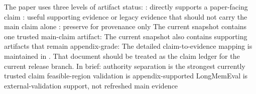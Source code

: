 {}
\markdownRendererSectionEnd \markdownRendererSectionBegin
{}\markdownRendererInterblockSeparator
{}The paper uses three levels of artifact status:\markdownRendererInterblockSeparator
{}\markdownRendererUlBeginTight
\markdownRendererUlItem {}: directly supports a paper-facing claim\markdownRendererUlItemEnd 
\markdownRendererUlItem {}: useful supporting evidence or legacy evidence that should not carry the main claim alone\markdownRendererUlItemEnd 
\markdownRendererUlItem {}: preserve for provenance only\markdownRendererUlItemEnd 
\markdownRendererUlEndTight \markdownRendererInterblockSeparator
{}The current snapshot contains one trusted main-claim artifact:\markdownRendererInterblockSeparator
{}\markdownRendererUlBeginTight
\markdownRendererUlItem {}\markdownRendererUlItemEnd 
\markdownRendererUlEndTight \markdownRendererInterblockSeparator
{}The current snapshot also contains supporting artifacts that remain appendix-grade:\markdownRendererInterblockSeparator
{}\markdownRendererUlBeginTight
\markdownRendererUlItem {}\markdownRendererUlItemEnd 
\markdownRendererUlItem {}\markdownRendererUlItemEnd 
\markdownRendererUlEndTight \markdownRendererInterblockSeparator
{}
\markdownRendererSectionEnd \markdownRendererSectionBegin
{}\markdownRendererInterblockSeparator
{}The detailed claim-to-evidence mapping is maintained in .\markdownRendererSoftLineBreak
{}That document should be treated as the claim ledger for the current release branch.\markdownRendererParagraphSeparator
{}In brief:\markdownRendererInterblockSeparator
{}\markdownRendererUlBeginTight
\markdownRendererUlItem authority separation is the strongest currently trusted claim\markdownRendererUlItemEnd 
\markdownRendererUlItem feasible-region validation is appendix-supported\markdownRendererUlItemEnd 
\markdownRendererUlItem LongMemEval is external-validation support, not refreshed main evidence\markdownRendererUlItemEnd 

